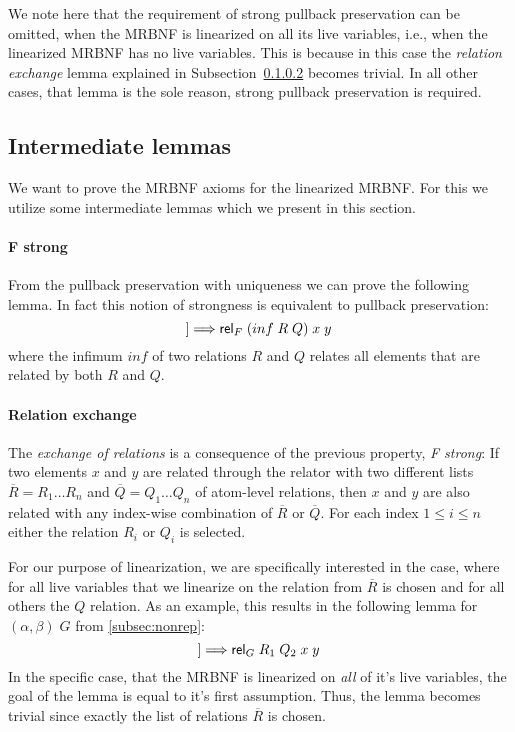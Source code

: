     We note here that the requirement of strong pullback preservation can be omitted, when the \ac{MRBNF} is linearized on all its live variables, i.e., when the linearized \ac{MRBNF} has no live variables. This is because in this case the \textit{relation exchange} lemma explained in Subsection~\ref{par:rel_exchange} becomes trivial. In all other cases, that lemma is the sole reason, strong pullback preservation is required.

  \subsection{Intermediate lemmas}
    We want to prove the \ac{MRBNF} axioms for the linearized \ac{MRBNF}. For this we utilize some intermediate lemmas which we present in this section.
    
    \paragraph{F strong}
      From the pullback preservation with uniqueness we can prove the following lemma. In fact this notion of strongness is equivalent to pullback preservation: 
      \begin{equation*}
        [\![\text{\textsf{rel}}_F\; R\; x\; y;\; \text{\textsf{rel}}_F\; Q\; x\; y]\!] \Longrightarrow \text{\textsf{rel}}_F\; (inf\; R\; Q)\; x\; y
      \end{equation*} 
      where the infimum $inf$ of two relations $R$ and $Q$ relates all elements that are related by both $R$ and $Q$.

    \paragraph{Relation exchange}
    \label{par:rel_exchange}
      The \textit{exchange of relations} is a consequence of the previous property, \textit{F strong}: If two elements $x$ and $y$ are related through the relator with two different lists $\overline{R} = R_1 \dots R_n$ and $\overline{Q} = Q_1 \dots Q_n$ of atom-level relations, then $x$ and $y$ are also related with any index-wise combination of $\overline{R}$ or $\overline{Q}$. For each index $1 \leq i \leq n$ either the relation $R_i$ or $Q_i$ is selected. 
      
      For our purpose of linearization, we are specifically interested in the case, where for all live variables that we linearize on the relation from $\overline{R}$ is chosen and for all others the $Q$ relation. As an example, this results in the following lemma for $(\alpha, \beta)\; G$ from \autoref{subsec:nonrep}:
      \begin{equation*}
        [\![\text{\textsf{rel}}_G\; R_1\; R_2\; x\; y;\; \text{\textsf{rel}}_G\; Q_1\; Q_2\; x\; y]\!] \Longrightarrow \text{\textsf{rel}}_G\; R_1\; Q_2\; x\; y
      \end{equation*} 
      In the specific case, that the \ac{MRBNF} is linearized on \textit{all} of it's live variables, the goal of the lemma is equal to it's first assumption. Thus, the lemma becomes trivial since exactly the list of relations $\overline{R}$ is chosen.

